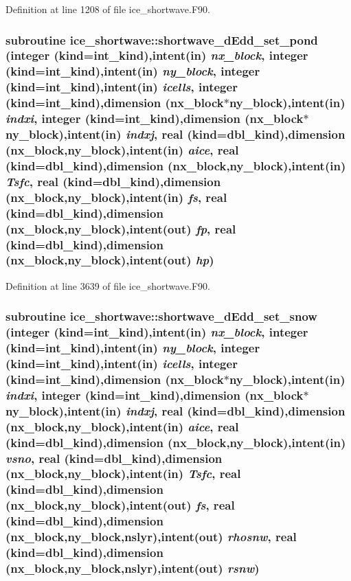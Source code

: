 \label{namespaceice__shortwave_a628868bc140ea7881708332dd8ef24d4}


Definition at line 1208 of file ice\_\-shortwave.F90.\hypertarget{namespaceice__shortwave_a09f51c7b0e45e37eeba70b3332d60750}{
\subsubsection[{shortwave\_\-dEdd\_\-set\_\-pond}]{\setlength{\rightskip}{0pt plus 5cm}subroutine ice\_\-shortwave::shortwave\_\-dEdd\_\-set\_\-pond (integer (kind=int\_\-kind),intent(in) {\em nx\_\-block}, \/  integer (kind=int\_\-kind),intent(in) {\em ny\_\-block}, \/  integer (kind=int\_\-kind),intent(in) {\em icells}, \/  integer (kind=int\_\-kind),dimension (nx\_\-block$\ast$ny\_\-block),intent(in) {\em indxi}, \/  integer (kind=int\_\-kind),dimension (nx\_\-block$\ast$ny\_\-block),intent(in) {\em indxj}, \/  real (kind=dbl\_\-kind),dimension (nx\_\-block,ny\_\-block),intent(in) {\em aice}, \/  real (kind=dbl\_\-kind),dimension (nx\_\-block,ny\_\-block),intent(in) {\em Tsfc}, \/  real (kind=dbl\_\-kind),dimension (nx\_\-block,ny\_\-block),intent(in) {\em fs}, \/  real (kind=dbl\_\-kind),dimension (nx\_\-block,ny\_\-block),intent(out) {\em fp}, \/  real (kind=dbl\_\-kind),dimension (nx\_\-block,ny\_\-block),intent(out) {\em hp})}}
\label{namespaceice__shortwave_a09f51c7b0e45e37eeba70b3332d60750}


Definition at line 3639 of file ice\_\-shortwave.F90.\hypertarget{namespaceice__shortwave_a6cfca7557b0dd2a30e5570b0c0d5ef36}{
\subsubsection[{shortwave\_\-dEdd\_\-set\_\-snow}]{\setlength{\rightskip}{0pt plus 5cm}subroutine ice\_\-shortwave::shortwave\_\-dEdd\_\-set\_\-snow (integer (kind=int\_\-kind),intent(in) {\em nx\_\-block}, \/  integer (kind=int\_\-kind),intent(in) {\em ny\_\-block}, \/  integer (kind=int\_\-kind),intent(in) {\em icells}, \/  integer (kind=int\_\-kind),dimension (nx\_\-block$\ast$ny\_\-block),intent(in) {\em indxi}, \/  integer (kind=int\_\-kind),dimension (nx\_\-block$\ast$ny\_\-block),intent(in) {\em indxj}, \/  real (kind=dbl\_\-kind),dimension (nx\_\-block,ny\_\-block),intent(in) {\em aice}, \/  real (kind=dbl\_\-kind),dimension (nx\_\-block,ny\_\-block),intent(in) {\em vsno}, \/  real (kind=dbl\_\-kind),dimension (nx\_\-block,ny\_\-block),intent(in) {\em Tsfc}, \/  real (kind=dbl\_\-kind),dimension (nx\_\-block,ny\_\-block),intent(out) {\em fs}, \/  real (kind=dbl\_\-kind),dimension (nx\_\-block,ny\_\-block,nslyr),intent(out) {\em rhosnw}, \/  real (kind=dbl\_\-kind),dimension (nx\_\-block,ny\_\-block,nslyr),intent(out) {\em rsnw})}}
\label{namespaceice__shortwave_a6cfca7557b0dd2a30e5570b0c0d5ef36}


